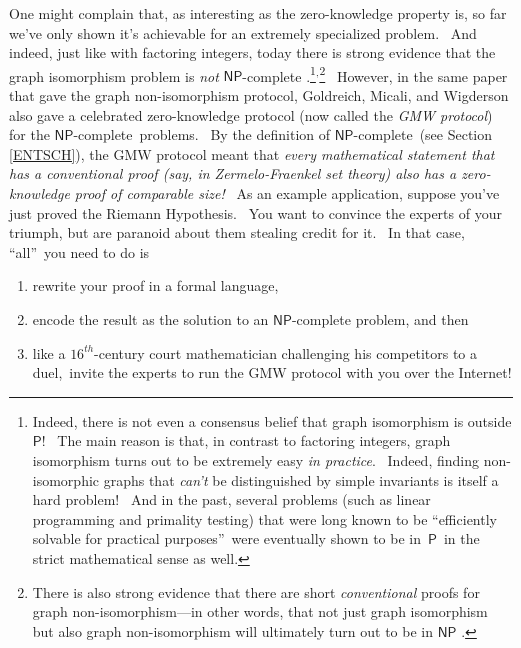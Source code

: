 \documentclass[11pt,onecolumn]{article}%
\begin{document}
One might complain that, as interesting as the zero-knowledge property is, so
far we've only shown it's achievable for an extremely specialized problem.
\ And indeed, just like with factoring integers, today there is strong
evidence that the graph isomorphism problem is \textit{not} $\mathsf{NP}%
$-complete \cite{bhz}.\footnote{Indeed, there is not even a consensus belief
that graph isomorphism is outside $\mathsf{P}$! \ The main reason is that, in
contrast to factoring integers, graph isomorphism turns out to be extremely
easy \textit{in practice}. \ Indeed, finding non-isomorphic graphs that
\textit{can't} be distinguished by simple invariants is itself a hard problem!
\ And in the past, several problems (such as linear programming and primality
testing) that were long known to be \textquotedblleft efficiently solvable for
practical purposes\textquotedblright\ were eventually shown to be
in\ $\mathsf{P}$\ in the strict mathematical sense as well.}$^{,}%
$\footnote{There is also strong evidence that there are short
\textit{conventional} proofs for graph non-isomorphism---in other words, that
not just graph isomorphism but also graph non-isomorphism will ultimately turn
out to be in $\mathsf{NP}$ \cite{kvm}.} \ However, in the same paper that gave
the graph non-isomorphism protocol, Goldreich, Micali, and Wigderson
\cite{gmw} also gave a celebrated zero-knowledge protocol (now called the
\textit{GMW protocol}) for the $\mathsf{NP}$-complete\ problems. \ By the
definition of $\mathsf{NP}$-complete\ (see Section \ref{ENTSCH}), the GMW
protocol meant that \textit{every mathematical statement that has a
conventional proof (say, in Zermelo-Fraenkel set theory) also has a
zero-knowledge proof of comparable size!} \ As an example application, suppose
you've just proved the Riemann Hypothesis. \ You want to convince the experts
of your triumph, but are paranoid about them stealing credit for it. \ In that
case, \textquotedblleft all\textquotedblright\ you need to do is

\begin{enumerate}
\item[(1)] rewrite your proof in a formal language,

\item[(2)] encode the result as the solution to an $\mathsf{NP}$-complete
problem, and then

\item[(3)] like a $16^{th}$-century court mathematician challenging his
competitors to a duel,\ invite the experts to run the GMW protocol with you
over the Internet!
\end{enumerate}
\end{document}
